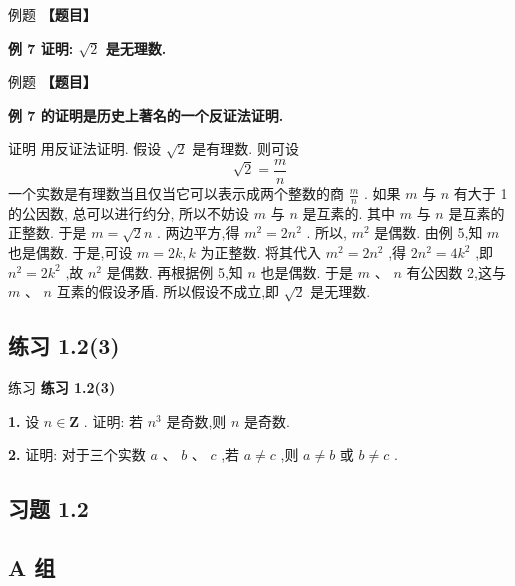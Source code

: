 \documentclass[a4paper,10pt,oneside,fontset=none]{ctexbook}
\newcounter{example}[chapter]
\newenvironment{example}[1][]{\begin{exBox}{例题}{#1}}{\end{exBox}}
\newenvironment{exercise}[1][]{\begin{exBox}{练习}{#1}}{\end{exBox}}
\numberwithin{equation}{chapter}
\begin{document}
\begin{example}
\textbf{【题目】}\par\vspace{0.3em}
\textbf{例 7 证明: $\sqrt{2}$ 是无理数.}\par\vspace{0.3em}
\end{example}

\begin{example}
\textbf{【题目】}\par\vspace{0.3em}
\textbf{例 7 的证明是历史上著名的一个反证法证明.}\par\vspace{0.3em}
证明 用反证法证明.
假设 $\sqrt{2}$ 是有理数. 则可设
$$
\sqrt{2} = \frac{m}{n}
$$
一个实数是有理数当且仅当它可以表示成两个整数的商 $\frac{m}{n}$ . 如果 $m$ 与 $n$ 有大于 1 的公因数, 总可以进行约分, 所以不妨设 $m$ 与 $n$ 是互素的.
其中 $m$ 与 $n$ 是互素的正整数. 于是 $m = \sqrt{2}n$ . 两边平方,得 ${m}^{2} = 2{n}^{2}$ . 所以, ${m}^{2}$ 是偶数. 由例 5,知 $m$ 也是偶数. 于是,可设 $m = {2k}, k$ 为正整数. 将其代入 ${m}^{2} = 2{n}^{2}$ ,得 $2{n}^{2} = 4{k}^{2}$ ,即 ${n}^{2} = 2{k}^{2}$ ,故 ${n}^{2}$ 是偶数. 再根据例 5,知 $n$ 也是偶数. 于是 $m\text{ 、 }n$ 有公因数 2,这与 $m\text{ 、 }n$ 互素的假设矛盾.
所以假设不成立,即 $\sqrt{2}$ 是无理数.
\end{example}

\subsection*{练习 1.2(3)}

\begin{exercise}
\textbf{练习 1.2(3)}\par\vspace{0.5em}
\textbf{1.} 设 $n \in  \mathbf{Z}$ . 证明: 若 ${n}^{3}$ 是奇数,则 $n$ 是奇数.
\par\vspace{0.8em}
\textbf{2.} 证明: 对于三个实数 $a\text{ 、 }b\text{ 、 }c$ ,若 $a \neq  c$ ,则 $a \neq  b$ 或 $b \neq  c$ .
\end{exercise}

\subsection*{习题 1.2}

\subsection*{A 组}
\end{document}
